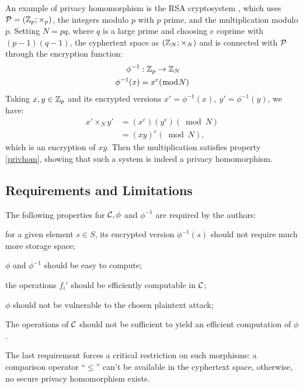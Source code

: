 An example of privacy homomorphism is the RSA cryptosystem \cite{rsa}, which uses $\mathcal P = (\mathbb{Z}_p;\times_p)$, the integers modulo $p$ with $p$ prime, and the multiplication modulo $p$. Setting $N=pq$, where $q$ is a large prime and choosing $e$ coprime with $(p-1)(q-1)$,  the cyphertext space as $(\mathbb{Z}_N;\times_N)$ and is connected with $\mathcal P$ through the encryption function:
\begin{align*}
    \phi^{-1}&:\mathbb{Z}_p\to\mathbb{Z}_N\\
    \phi^{-1}(x)&=x^e(\bmod N)
\end{align*}
Taking $x,y\in\mathbb{Z}_p$ and its encrypted versions $x'=\phi^{-1}(x),~y'=\phi^{-1}(y)$, we have:
\begin{align*}
    x'\times_N y'&= (x^e)(y^e)(\bmod N)\\
    &=(xy)^e(\bmod N),
\end{align*}
which is an encryption of $xy$. Then the multiplication satisfies property \ref{privhom}, showing that such a system is indeed a privacy homomorphism.

\subsection{Requirements and Limitations}
The following properties for $\mathcal C,\phi$ and $\phi^{-1}$ are required by the authors:
\begin{alineas}
    \item for a given element $s\in S$, its encrypted version $\phi^{-1}(s)$ should not require much more storage space;
    \item $\phi$ and $\phi^{-1}$ should be easy to compute;
    \item the operations $f_i'$ should be efficiently computable in $\mathcal C$;
    \item $\phi$ should not be vulnerable to the chosen plaintext attack;
    \item The operations of $\mathcal C$ should not be sufficient to yield an efficient computation of $\phi$.
\end{alineas}

The last requirement forces a critical restriction on such morphisms: a comparison operator ``$\leq$'' can't be available in the cyphertext space, otherwise, no secure privacy homomorphism exists.


